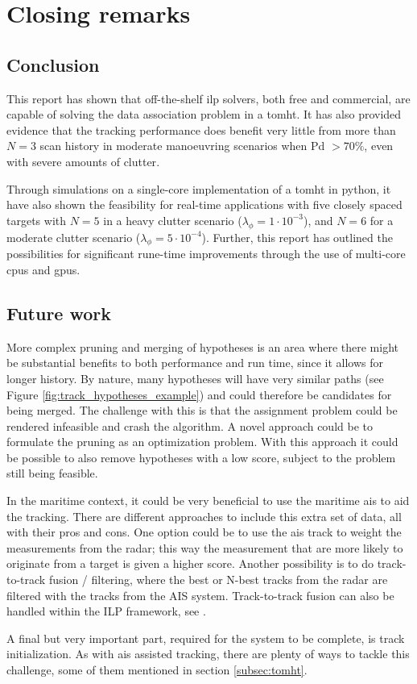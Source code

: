 \section{Closing remarks}
\subsection{Conclusion}
This report has shown that off-the-shelf \gls{ilp} \glspl{solver}, both free and commercial, are capable of solving the data association problem in a \gls{tomht}. It has also provided evidence that the \gls{tracking} performance does benefit very little from more than $N=3$ scan history in moderate manoeuvring scenarios when \gls{Pd} $> 70\%$, even with severe amounts of \gls{clutter}.

Through simulations on a single-core implementation of a \gls{tomht} in \gls{python}, it have also shown the feasibility for real-time applications with five closely spaced targets with $N=5$ in a heavy clutter scenario ($\lambda_\phi = 1 \cdot 10^{-3}$), and $N=6$ for a moderate clutter scenario ($\lambda_\phi = 5 \cdot 10 ^{-4}$). Further, this report has  outlined the possibilities for significant rune-time improvements through the use of multi-core \glspl{cpu} and \glspl{gpu}.

\subsection{Future work}
More complex \gls{pruning} and merging of hypotheses is an area where there might be substantial benefits to both performance and run time, since it allows for longer history. By nature, many hypotheses will have very similar paths (see Figure \ref{fig:track_hypotheses_example}) and could therefore be candidates for being merged. The challenge with this is that the assignment problem could be rendered infeasible and crash the algorithm. A novel approach could be to formulate the pruning as an optimization problem. With this approach it could be possible to also remove hypotheses with a low score, subject to the problem still being feasible.

In the maritime context, it could be very beneficial to use the maritime \gls{ais} to aid the \gls{tracking}. There are different approaches to include this extra set of data, all with their pros and cons. One option could be to use the \gls{ais} track to weight the measurements from the radar; this way the measurement that are more likely to originate from a target is given a higher score. Another possibility is to do track-to-track fusion / filtering, where the best or N-best tracks from the radar are filtered with the tracks from the AIS system. Track-to-track fusion can also be handled within the ILP framework, see \cite{Coraluppi2000}.

A final but very important part, required for the system to be complete, is track initialization. As with \gls{ais} assisted \gls{tracking}, there are plenty of ways to tackle this challenge, some of them mentioned in section \ref{subsec:tomht}.